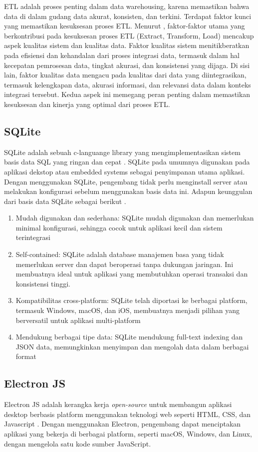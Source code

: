 ETL adalah proses penting dalam data warehousing, karena memastikan bahwa data di dalam gudang data akurat, konsisten, dan terkini. Terdapat faktor kunci yang memastikan kesuksesan proses ETL. Menurut \textcite{Ahmad2022THESF}, faktor-faktor utama yang berkontribusi pada kesuksesan proses ETL (Extract, Transform, Load) mencakup aspek kualitas sistem dan kualitas data. Faktor kualitas sistem menitikberatkan pada efisiensi dan kehandalan dari proses integrasi data, termasuk dalam hal kecepatan pemrosesan data, tingkat akurasi, dan konsistensi yang dijaga. Di sisi lain, faktor kualitas data mengacu pada kualitas dari data yang diintegrasikan, termasuk kelengkapan data, akurasi informasi, dan relevansi data dalam konteks integrasi tersebut. Kedua aspek ini memegang peran penting dalam memastikan kesuksesan dan kinerja yang optimal dari proses ETL.

\subsection{SQLite}
SQLite adalah sebuah c-languange library  yang mengimplementasikan sistem basis data SQL yang ringan dan cepat \parencite{sqlite-intro}. SQLite pada umumnya digunakan pada aplikasi dekstop atau embedded systems sebagai penyimpanan utama aplikasi. Dengan menggunakan SQLite, pengembang tidak perlu menginstall server atau melakukan konfigurasi sebelum menggunakan basis data ini. Adapun keunggulan dari basis data SQLite sebagai berikut \parencite{sqlite-advantage}.
\begin{enumerate}
  \item Mudah digunakan dan sederhana: SQLite mudah digunakan dan memerlukan minimal konfigurasi, sehingga cocok untuk aplikasi kecil dan sistem terintegrasi
  \item Self-contained: SQLite adalah database manajemen basa yang tidak memerlukan server dan dapat beroperasi tanpa dukungan jaringan. Ini membuatnya ideal untuk aplikasi yang membutuhkan operasi transaksi dan konsistensi tinggi.
  \item Kompatibilitas cross-platform: SQLite telah diportasi ke berbagai platform, termasuk Windows, macOS, dan iOS, membuatnya menjadi pilihan yang berversatil untuk aplikasi multi-platform
  \item Mendukung berbagai tipe data: SQLite mendukung full-text indexing dan JSON data, memungkinkan menyimpan dan mengolah data dalam berbagai format
\end{enumerate} 

\subsection{Electron JS}
Electron JS adalah kerangka kerja \emph{open-source} untuk membangun aplikasi desktop berbasis platform menggunakan teknologi web seperti HTML, CSS, dan Javascript \parencite{ElectronJS}. Dengan menggunakan Electron, pengembang dapat menciptakan aplikasi yang bekerja di berbagai platform, seperti macOS, Windows, dan Linux, dengan mengelola satu kode sumber JavaScript.

